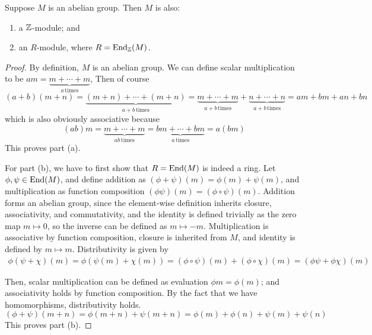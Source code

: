 \begin{theorem}
    Suppose \(M\) is an abelian group.
    Then \(M\) is also:
    \begin{enumerate}[label={(\alph*)}, itemsep=0mm]
        \item a \(\mathbb{Z}\)-module; and
        \item an \(R\)-module, where \(R = \operatorname{End}_{\mathbb{Z}}(M)\).
    \end{enumerate}
\end{theorem}
\begin{proof}
    By definition, \(M\) is an abelian group.
    We can define scalar multiplication to be \(am = \underbrace{m+\cdots+m}_{a\,\text{times}}\),
    Then of course
    \begin{equation*}
        (a+b)(m+n) = \underbrace{(m+n)+\cdots+(m+n)}_{a+b\,\text{times}}
        = \underbrace{m+\cdots+m}_{a+b\,\text{times}} + \underbrace{n+\cdots+n}_{a+b\,\text{times}}
        = am + bm + an + bn
    \end{equation*}
    which is also obviously associative because
    \begin{equation*}
        (ab)m = \underbrace{m+\cdots+m}_{ab\,\text{times}}
        = \underbrace{bm+\cdots+bm}_{a\,\text{times}}
        = a(bm)
    \end{equation*}
    This proves part (a).

    For part (b), we have to first show that \(R = \operatorname{End}(M)\) is indeed a ring.
    Let \(\phi,\psi \in \operatorname{End}(M)\),
    and define addition as \((\phi+\psi)(m) = \phi(m)+\psi(m)\),
    and multiplication as function composition \((\phi\psi)(m) = (\phi\circ\psi)(m)\).
    Addition forms an abelian group,
    since the element-wise definition inherits closure, associativity, and commutativity,
    and the identity is defined trivially as the zero map \(m \mapsto 0\),
    so the inverse can be defined as \(m \mapsto -m\).
    Multiplication is associative by function composition,
    closure is inherited from \(M\),
    and identity is defined by \(m \mapsto m\).
    Distributivity is given by
    \begin{gather*}
        \phi(\psi+\chi)(m) = \phi(\psi(m)+\chi(m))
        = (\phi\circ\psi)(m) + (\phi\circ\chi)(m)
        = (\phi\psi+\phi\chi)(m)
    \end{gather*}

    Then, scalar multiplication can be defined as evaluation \(\phi m = \phi(m)\);
    and associativity holds by function composition.
    By the fact that we have homomorphisms,
    distributivity holds.
    \begin{equation*}
        (\phi+\psi)(m+n) = \phi(m+n) + \psi(m+n)
        = \phi(m) + \phi(n) + \psi(m) + \psi(n)
    \end{equation*}
    This proves part (b).
\end{proof}

